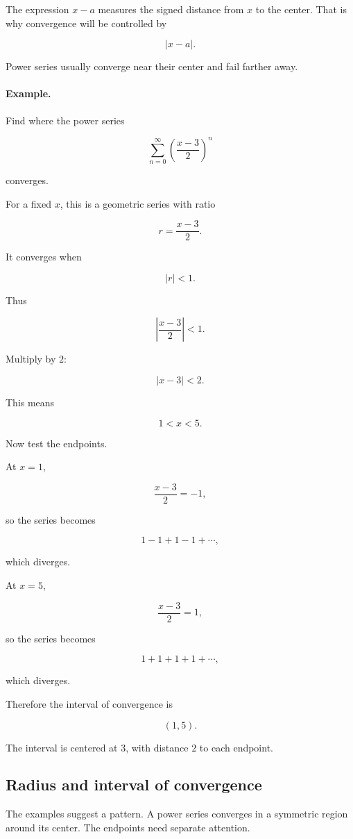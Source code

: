 The expression \(x-a\) measures the signed distance from \(x\) to the center.  That is
why convergence will be controlled by

\[
|x-a|.
\]

Power series usually converge near their center and fail farther away.

\paragraph{Example.}
Find where the power series

\[
\sum_{n=0}^{\infty}\left(\frac{x-3}{2}\right)^n
\]

converges.

For a fixed \(x\), this is a geometric series with ratio

\[
r=\frac{x-3}{2}.
\]

It converges when

\[
|r|<1.
\]

Thus

\[
\left|\frac{x-3}{2}\right|<1.
\]

Multiply by \(2\):

\[
|x-3|<2.
\]

This means

\[
1<x<5.
\]

Now test the endpoints.

At \(x=1\),

\[
\frac{x-3}{2}=-1,
\]

so the series becomes

\[
1-1+1-1+\cdots,
\]

which diverges.

At \(x=5\),

\[
\frac{x-3}{2}=1,
\]

so the series becomes

\[
1+1+1+1+\cdots,
\]

which diverges.

Therefore the interval of convergence is

\[
\boxed{(1,5).}
\]

The interval is centered at \(3\), with distance \(2\) to each endpoint.

\subsection{Radius and interval of convergence}
\label{subsec:radius-interval-convergence}

The examples suggest a pattern.  A power series converges in a symmetric region
around its center.  The endpoints need separate attention.


